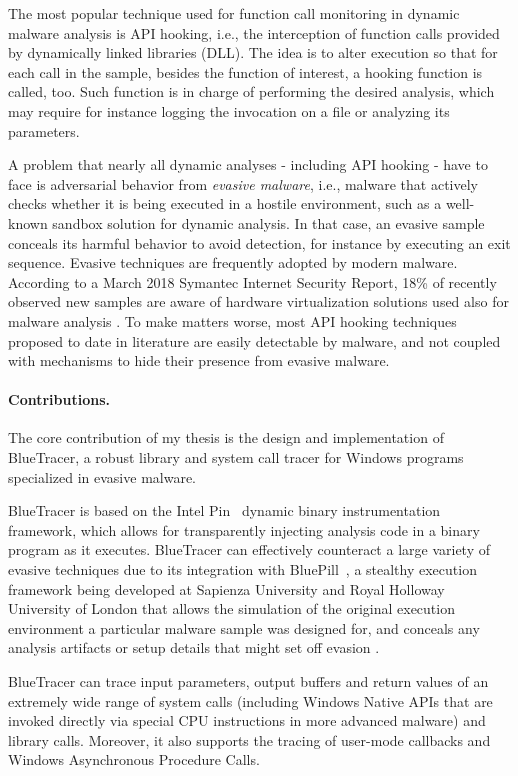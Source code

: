 The most popular technique used for function call monitoring in dynamic malware analysis is API hooking, i.e., the interception of function calls provided by dynamically linked libraries (DLL). The idea is to alter execution so that for each call in the sample, besides the function of interest, a hooking function is called, too. Such function is in charge of performing the desired analysis, which may require for instance logging the invocation on a file or analyzing its parameters.

A problem that nearly all dynamic analyses - including API hooking - have to face is adversarial behavior from \textit{evasive malware}, i.e., malware that actively checks whether it is being executed in a hostile environment, such as a well-known sandbox solution for dynamic analysis. In that case, an evasive sample conceals its harmful behavior to avoid detection, for instance by executing an exit sequence. Evasive techniques are frequently adopted by modern malware. According to a March 2018 Symantec Internet Security Report, 18\% of recently observed new samples are aware of hardware virtualization solutions used also for malware analysis \cite{Symantec}. To make matters worse, most API hooking techniques proposed to date in literature are easily detectable by malware, and not coupled with mechanisms to hide their presence from evasive malware.

\paragraph{Contributions.}The core contribution of my thesis is the design and implementation of BlueTracer, a robust library and system call tracer for Windows programs specialized in evasive malware.

BlueTracer is based on the Intel Pin~\cite{Luk05} dynamic binary instrumentation framework, which allows for transparently injecting analysis code in a binary program as it executes. BlueTracer can effectively counteract a large variety of evasive techniques due to its integration with BluePill~\cite{BluePill}, a stealthy execution framework being developed at Sapienza University and Royal Holloway University of London that allows the simulation of the original execution environment a particular malware sample was designed for, and conceals any analysis artifacts or setup details that might set off evasion \cite{BluePill}.

BlueTracer can trace input parameters, output buffers and return values of an extremely wide range of system calls (including Windows Native APIs that are invoked directly via special CPU instructions in more advanced malware) and library calls. Moreover, it also supports the tracing of user-mode callbacks and Windows Asynchronous Procedure Calls. 

